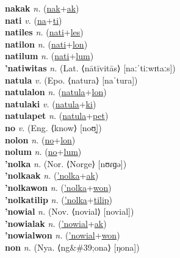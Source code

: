 \textbf{nakak} \textit{n.} (\hyperref[nak]{nak}+\hyperref[ak]{ak})
 \label{nakak} \\
\textbf{nati} \textit{v.} (\hyperref[na]{na}+\hyperref[ti]{ti})
 \label{nati} \\
\textbf{natiles} \textit{n.} (\hyperref[nati]{nati}+\hyperref[les]{les})
 \label{natiles} \\
\textbf{natilon} \textit{n.} (\hyperref[nati]{nati}+\hyperref[lon]{lon})
 \label{natilon} \\
\textbf{natilum} \textit{n.} (\hyperref[nati]{nati}+\hyperref[lum]{lum})
 \label{natilum} \\
\textbf{'natiwitas} \textit{n.} (Lat. ⟨nātīvitās⟩ [naːˈtiːwɪtaːs])
 \label{'natiwitas} \\
\textbf{natula} \textit{v.} (Epo. ⟨natura⟩ [naˈtura])
 \label{natula} \\
\textbf{natulalon} \textit{n.} (\hyperref[natula]{natula}+\hyperref[lon]{lon})
 \label{natulalon} \\
\textbf{natulaki} \textit{v.} (\hyperref[natula]{natula}+\hyperref[ki]{ki})
 \label{natulaki} \\
\textbf{natulapet} \textit{n.} (\hyperref[natula]{natula}+\hyperref[pet]{pet})
 \label{natulapet} \\
\textbf{no} \textit{v.} (Eng. ⟨know⟩ [noʊ̯])
 \label{no} \\
\textbf{nolon} \textit{n.} (\hyperref[no]{no}+\hyperref[lon]{lon})
 \label{nolon} \\
\textbf{nolum} \textit{n.} (\hyperref[no]{no}+\hyperref[lum]{lum})
 \label{nolum} \\
\textbf{'nolka} \textit{n.} (Nor. ⟨Norge⟩ [nʊɾɡə])
 \label{'nolka} \\
\textbf{'nolkaak} \textit{n.} (\hyperref['nolka]{'nolka}+\hyperref[ak]{ak})
 \label{'nolkaak} \\
\textbf{'nolkawon} \textit{n.} (\hyperref['nolka]{'nolka}+\hyperref[won]{won})
 \label{'nolkawon} \\
\textbf{'nolkatilip} \textit{n.} (\hyperref['nolka]{'nolka}+\hyperref[tilip]{tilip})
 \label{'nolkatilip} \\
\textbf{'nowial} \textit{n.} (Nov. ⟨novial⟩ [novial])
 \label{'nowial} \\
\textbf{'nowialak} \textit{n.} (\hyperref['nowial]{'nowial}+\hyperref[ak]{ak})
 \label{'nowialak} \\
\textbf{'nowialwon} \textit{n.} (\hyperref['nowial]{'nowial}+\hyperref[won]{won})
 \label{'nowialwon} \\
\textbf{non} \textit{n.} (Nya. ⟨ng\&\#39;ona⟩ [ŋona])
